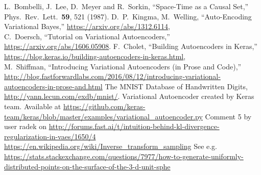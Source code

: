 \documentclass[letterpaper,10pt]{article}
\begin{document}
\begin{thebibliography}{99}
L.~Bombelli, J.~Lee, D.~Meyer and R.~Sorkin,
  ``Space-Time as a Causal Set,''
  Phys.\ Rev.\ Lett.\  {\bf 59}, 521 (1987).
D.~P.~Kingma, M.~Welling, ``Auto-Encoding Variational Bayes,'' \href{https://arxiv.org/abs/1312.6114}{https://arxiv.org/abs/1312.6114},\\
C.~Doersch, ``Tutorial on Variational Autoencoders,'' \href{https://arxiv.org/abs/1606.05908}{https://arxiv.org/abs/1606.05908}.
F.~Cholet, ``Building Autoencoders in Keras,'' \href{https://blog.keras.io/building-autoencoders-in-keras.html}{https://blog.keras.io/building-autoencoders-in-keras.html},\\
M.~Shiffman, ``Introducing Variational Autoencoders (in Prose and Code),'' \href{http://blog.fastforwardlabs.com/2016/08/12/introducing-variational-autoencoders-in-prose-and.html}
{http://blog.fastforwardlabs.com/2016/08/12/introducing-variational-autoencoders-in-prose-and.html}
 The MNIST Database of Handwritten Digits, \href{http://yann.lecun.com/exdb/mnist/}{http://yann.lecun.com/exdb/mnist/}.
 Variational Autoencoder created by Keras team. 
 Available at \href{https://github.com/keras-team/keras/blob/master/examples/variational_autoencoder.py}{https://github.com/keras-team/keras/blob/master/examples/variational\_autoencoder.py}
 Comment 5 by user radek on \href{http://forums.fast.ai/t/intuition-behind-kl-divergence-regularization-in-vaes/1650/4}
{http://forums.fast.ai/t/intuition-behind-kl-divergence-regularization-in-vaes/1650/4}
 \href{https://en.wikipedia.org/wiki/Inverse\_transform\_sampling}{https://en.wikipedia.org/wiki/Inverse\_transform\_sampling}
 See e.g. \href{https://stats.stackexchange.com/questions/7977/how-to-generate-uniformly-distributed-points-on-the-surface-of-the-3-d-unit-sphe}{https://stats.stackexchange.com/questions/7977/how-to-generate-uniformly-distributed-points-on-the-surface-of-the-3-d-unit-sphe}
\end{thebibliography}
\end{document}
